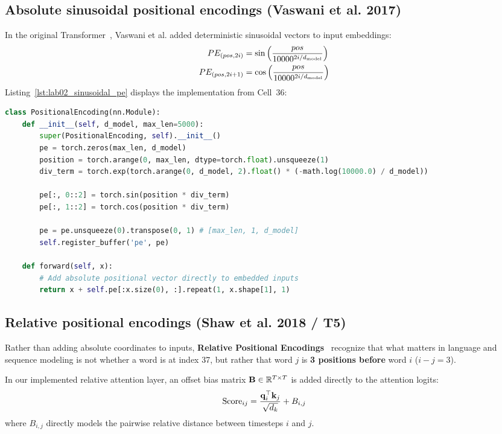 \documentclass[../labs.tex]{subfiles}
\begin{document}
\subsection{Absolute sinusoidal positional encodings (Vaswani et al. 2017)}

In the original Transformer~\cite{vaswani2017}, Vaswani et al. added deterministic sinusoidal vectors to input embeddings:
\begin{align}
    PE_{(pos, 2i)} &= \sin\left(\frac{pos}{10000^{2i / d_{\text{model}}}}\right) \\
    PE_{(pos, 2i+1)} &= \cos\left(\frac{pos}{10000^{2i / d_{\text{model}}}}\right)
\end{align}
Listing~\ref{lst:lab02_sinusoidal_pe} displays the implementation from Cell~36:

\begin{lstlisting}[language=Python, caption={Absolute sinusoidal positional encoding implementation (Cell 36).}, label={lst:lab02_sinusoidal_pe}]
class PositionalEncoding(nn.Module):
    def __init__(self, d_model, max_len=5000):
        super(PositionalEncoding, self).__init__()
        pe = torch.zeros(max_len, d_model)
        position = torch.arange(0, max_len, dtype=torch.float).unsqueeze(1)
        div_term = torch.exp(torch.arange(0, d_model, 2).float() * (-math.log(10000.0) / d_model))
        
        pe[:, 0::2] = torch.sin(position * div_term)
        pe[:, 1::2] = torch.cos(position * div_term)
        
        pe = pe.unsqueeze(0).transpose(0, 1) # [max_len, 1, d_model]
        self.register_buffer('pe', pe)

    def forward(self, x):
        # Add absolute positional vector directly to embedded inputs
        return x + self.pe[:x.size(0), :].repeat(1, x.shape[1], 1)
\end{lstlisting}

\subsection{Relative positional encodings (Shaw et al. 2018 / T5)}

Rather than adding absolute coordinates to inputs, \textbf{Relative Positional Encodings}~\cite{shaw2018,raffel2020t5} recognize that what matters in language and sequence modeling is not whether a word is at index 37, but rather that word $j$ is \textbf{3 positions before} word $i$ ($i - j = 3$).

In our implemented relative attention layer, an offset bias matrix $\mathbf{B} \in \mathbb{R}^{T \times T}$ is added directly to the attention logits:
\begin{equation}
    \text{Score}_{ij} = \frac{\mathbf{q}_i^\top \mathbf{k}_j}{\sqrt{d_k}} + B_{i, j}
\end{equation}
where $B_{i, j}$ directly models the pairwise relative distance between timesteps $i$ and $j$.
\end{document}
